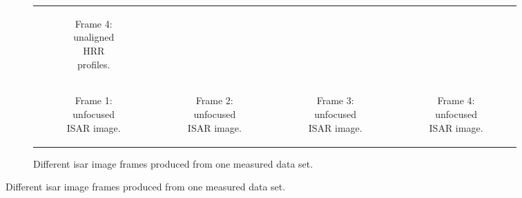 \documentclass[class=report,11pt,crop=false]{standalone}
\begin{document}
\begin{figure}[H]
\begin{minipage}{0.9\linewidth}
\begin{figure}
\begin{tabular}{@{}cccc@{}}
\begin{subfigure}{0.25\linewidth}
                        \caption{Frame 4: unaligned HRR profiles. \label{subfig:measured_data_frames_HRRP_4189}}
                    \end{subfigure}
                    \\
                    \begin{subfigure}{0.25\linewidth}
                        \centering
                        \resizebox{\linewidth}{!}{}
                        \caption{Frame 1: unfocused ISAR image.}
                    \end{subfigure}
                    &
                    \begin{subfigure}{0.25\linewidth}
                        \centering
                        \resizebox{\linewidth}{!}{}
                        \caption{Frame 2: unfocused ISAR image.}
                    \end{subfigure}
                    &
                    \begin{subfigure}{0.25\linewidth}
                        \centering
                        \resizebox{\linewidth}{!}{}
                         \caption{Frame 3: unfocused ISAR image.}
                    \end{subfigure}
                    &
                    \begin{subfigure}{0.25\linewidth}
                        \centering
                        \resizebox{\linewidth}{!}{}
                         \caption{Frame 4: unfocused ISAR image.}
                    \end{subfigure}
                \end{tabular}
                \caption{Different \gls{isar} image frames produced from one measured data set. \label{fig:measured_data_frames}}
            \end{figure}
        \end{minipage}
    \end{figure}
\end{document}
